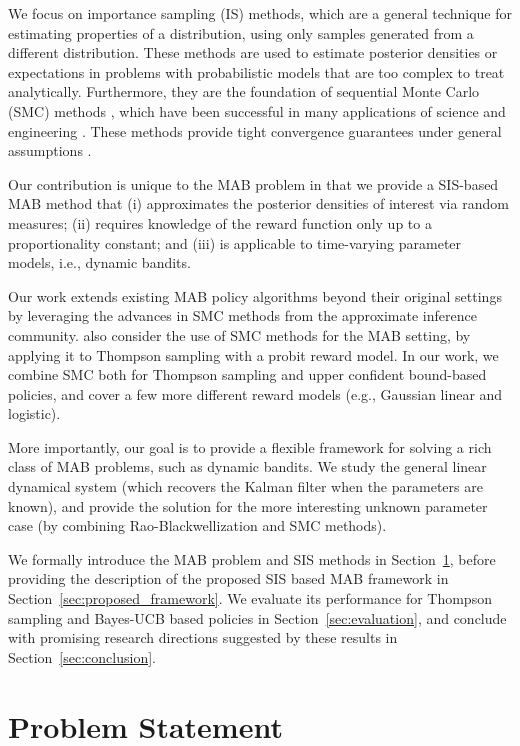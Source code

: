 \documentclass{article}
\newcommand{\ie}{i.e., }
\newcommand{\eg}{e.g., }
\begin{document}
We focus on importance sampling (IS) methods, which are a general technique for estimating properties of a distribution, using only samples generated from a different distribution. These methods are used to estimate posterior densities or expectations in problems with probabilistic models that are too complex to treat analytically. Furthermore, they are the foundation of sequential Monte Carlo (SMC) methods \cite{j-Arulampalam2002,b-Doucet2001,j-Djuric2003}, which have been successful in many applications of science and engineering \cite{b-Ristic2004,j-Leeuwen2009,j-Ionides2006,j-Creal2012}. These methods provide tight convergence guarantees under general assumptions \cite{j-Crisan2002,j-Chopin2004}.

Our contribution is unique to the MAB problem in that we provide a SIS-based MAB method that (i) approximates the posterior densities of interest via random measures; (ii) requires knowledge of the reward function only up to a proportionality constant; and (iii) is applicable to time-varying parameter models, \ie dynamic bandits. 

Our work extends existing MAB policy algorithms beyond their original settings by leveraging the advances in SMC methods from the approximate inference community. \citet{j-Cherkassky2013} also consider the use of SMC methods for the MAB setting, by applying it to Thompson sampling with a probit reward model. In our work, we combine SMC both for Thompson sampling and upper confident bound-based policies, and cover a few more different reward models (\eg Gaussian linear and logistic).

More importantly, our goal is to provide a flexible framework for solving a rich class of MAB problems, such as dynamic bandits. We study the general linear dynamical system (which recovers the Kalman filter when the parameters are known), and provide the solution for the more interesting unknown parameter case (by combining Rao-Blackwellization and SMC methods).

We formally introduce the MAB problem and SIS methods in Section~\ref{sec:problem_statement}, before providing the description of the proposed SIS based MAB framework in Section~\ref{sec:proposed_framework}. We evaluate its performance for Thompson sampling and Bayes-UCB based policies in Section~\ref{sec:evaluation}, and conclude with promising research directions suggested by these results in Section~\ref{sec:conclusion}.

\section{Problem Statement}
\label{sec:problem_statement}
\end{document}
